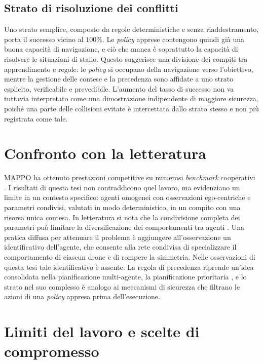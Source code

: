 \documentclass[12pt,a4paper,twoside]{report}
\newcommand{\parencite}[1]{\citep{#1}}
\begin{document}
\subsection{Strato di risoluzione dei conflitti}
Uno strato semplice, composto da regole deterministiche e senza riaddestramento, porta il successo vicino al $100\%$. Le \emph{policy} apprese contengono quindi già una buona capacità di navigazione, e ciò che manca è soprattutto la capacità di risolvere le situazioni di stallo. Questo suggerisce una divisione dei compiti tra apprendimento e regole: le \emph{policy} si occupano della navigazione verso l'obiettivo, mentre la gestione delle contese e la precedenza sono affidate a uno strato esplicito, verificabile e prevedibile. L'aumento del tasso di successo non va tuttavia interpretato come una dimostrazione indipendente di maggiore sicurezza, poiché una parte delle collisioni evitate è intercettata dallo strato stesso e non più registrata come tale.

\section{Confronto con la letteratura}
\label{sec:confronto_letteratura}

MAPPO ha ottenuto prestazioni competitive su numerosi \emph{benchmark} cooperativi \parencite{yu2022}. I risultati di questa tesi non contraddicono quel lavoro, ma evidenziano un limite in un contesto specifico: agenti omogenei con osservazioni ego-centriche e parametri condivisi, valutati in modo deterministico, in un compito con una risorsa unica contesa. In letteratura si nota che la condivisione completa dei parametri può limitare la diversificazione dei comportamenti tra agenti \parencite{christianos2021}. Una pratica diffusa per attenuare il problema è aggiungere all'osservazione un identificativo dell'agente, che consente alla rete condivisa di specializzare il comportamento di ciascun drone e di rompere la simmetria. Nelle osservazioni di questa tesi tale identificativo è assente.
\newpage
La regola di precedenza riprende un'idea consolidata nella pianificazione multi-agente, la pianificazione prioritaria \parencite{silver2005}, e lo strato nel suo complesso è analogo ai meccanismi di sicurezza che filtrano le azioni di una \emph{policy} appresa prima dell'esecuzione.

\section{Limiti del lavoro e scelte di compromesso}
\label{sec:limiti_lavoro}
\end{document}
